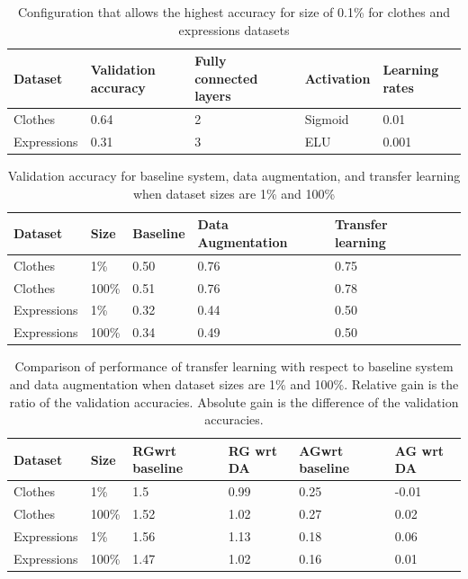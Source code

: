 \documentclass{article}
\begin{document}
\begin{table}[!htb]
  \centering
  \begin{tabular}{| l | l | l | l | l |}
    \hline
    \textbf{Dataset} & \textbf{Validation accuracy} & \textbf{Fully connected layers}& \textbf{Activation} & \textbf{Learning rates}\\ \hline
    Clothes & 0.64 & 2 & Sigmoid & 0.01 \\ \hline
    Expressions & 0.31  & 3 & ELU & 0.001 \\ \hline
  \end{tabular}
  \caption{Configuration that allows the highest accuracy for size of 0.1\% for clothes and expressions datasets}
  \label{tab:tf_1}
\end{table}

\begin{table}[!htb]
  \centering
  \begin{tabular}{| l | l | l | l | l | l |}
    \hline
    \textbf{Dataset} & \textbf{Size} & \textbf{Baseline} & \textbf{Data Augmentation}& \textbf{Transfer learning} \\ \hline
    Clothes & 1\% & 0.50 & 0.76 & 0.75 \\ \hline
    Clothes & 100\% & 0.51 & 0.76 & 0.78 \\ \hline
    Expressions & 1\% & 0.32  & 0.44 & 0.50 \\ \hline
    Expressions & 100\% & 0.34  & 0.49 & 0.50 \\ \hline
  \end{tabular}
  \caption{Validation accuracy for baseline system, data augmentation, and transfer learning when dataset sizes are 1\% and 100\%}
  \label{tab:tf_2}
\end{table}

\begin{table}[!htb]
  \centering
  \begin{tabular}{| l | l | l | l | l | l |}
    \hline
    \textbf{Dataset} & \textbf{Size} & \textbf{RG\footnotemark wrt baseline} & \textbf{RG wrt DA\footnotemark} & \textbf{AG\footnotemark wrt baseline} & \textbf{AG wrt DA}\\ \hline
    Clothes & 1\% & 1.5 & 0.99 & 0.25 & -0.01 \\ \hline
    Clothes & 100\% & 1.52 & 1.02 & 0.27 & 0.02 \\ \hline
    Expressions & 1\% & 1.56  & 1.13 & 0.18 & 0.06 \\ \hline
    Expressions & 100\% & 1.47 & 1.02 & 0.16 & 0.01 \\ \hline
  \end{tabular}
  \caption{Comparison of performance of transfer learning with respect to baseline system and data augmentation when dataset sizes are 1\% and 100\%. Relative gain is the ratio of the validation accuracies. Absolute gain is the difference of the validation accuracies.}
  \label{tab:tf_3}
\end{table}
\end{document}
